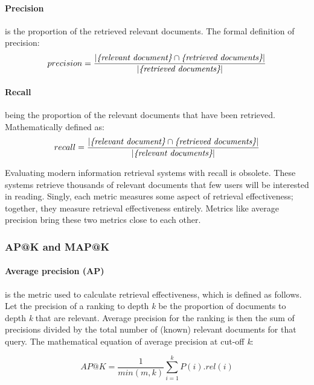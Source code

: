 \paragraph*{Precision} is the proportion of the retrieved relevant documents. The formal definition of precision:
\begin{equation}
    precision = \frac{|\emph{\{relevant document\}} \cap \emph{\{retrieved documents\}}|}{|\emph{\{retrieved documents\}}|}
    \label{eq:precision}
\end{equation}


\paragraph*{Recall} being the proportion of the relevant documents that have been retrieved. Mathematically defined as:
\begin{equation}
    recall = \frac{|\emph{\{relevant document\}} \cap \emph{\{retrieved documents\}}|}{|\emph{\{relevant documents\}}|}
    \label{eq:recall}
\end{equation}

Evaluating modern information retrieval systems with recall is obsolete. These systems retrieve thousands of relevant documents that few users will be interested in reading. Singly, each metric measures some aspect of retrieval effectiveness; together, they measure retrieval effectiveness entirely. Metrics like average precision bring these two metrics close to each other.

\subsubsection{AP@K and MAP@K}
\label{subsubsec:ap@k-map@k}
\paragraph*{Average precision (AP)} is the metric used to calculate retrieval effectiveness, which is defined as follows. 
Let the precision of a ranking to depth \emph{k} be
the proportion of documents to depth \emph{k} that are relevant.
Average precision for the ranking is then the sum of precisions divided by the total number of (known) relevant documents for that query.
The mathematical equation of average precision at cut-off \emph{k}:

\begin{equation}
    AP@K = \frac{1}{min(m,k)}\sum_{i=1}^{k}P(i).rel(i)
    \label{eq:ap@k}
\end{equation}

